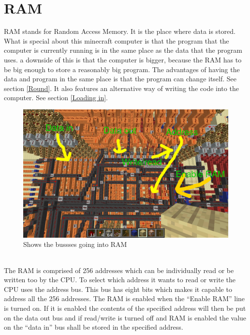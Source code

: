 \documentclass{article}
\begin{document}
\section{RAM}
RAM stands for Random Access Memory. It is the place where data is stored. What is special about this minecraft computer is that the program that the computer is currently running is in the same place as the data that the program uses. a downside of this is that the computer is bigger, because the RAM has to be big enough to store a reasonably big program. The advantages of having the data and program in the same place is that the program can change itself. See section \ref{Round}. It also features an alternative way of writing the code into the computer. See section \ref{Loading in}.
\begin{figure}[H]
\includegraphics[width=\textwidth]{Ram in and out.png}\caption{Shows the bussses going into RAM}
\end{figure}
~\\
The RAM is comprised of 256 addresses which can be individually read or be written too by the CPU. To select which address it wants to read or write the CPU uses the address bus. This bus has eight bits which makes it capable to address all the 256 addresses. The RAM is enabled when the ``Enable RAM'' line is turned on. If it is enabled the contents of the specified address will then be put on the data out bus and if read/write is turned off and RAM is enabled the value on the ``data in'' bus shall be stored in the specified address.
\end{document}
